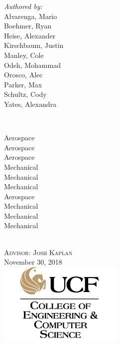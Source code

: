 \begin{titlepage}
{\begin{minipage}{0.3\textwidth}
\begin{flushleft} \large
\emph{Authored by:} \\ 
Alvarenga, Mario \\
Boehmer, Ryan \\
Heise, Alexander \\
Kirschbaum, Justin  \\
Manley, Cole \\
Odeh, Mohammad \\
Orosco, Alec \\
Parker, Max \\
Schultz, Cody \\
Yates, Alexandra \\
\end{flushleft}
\end{minipage}
~ 
\begin{minipage}{0.4\textwidth}
\begin{flushright} \large
\hfill
Aerospace \\
Aerospace \\
Aerospace \\
Mechanical \\
Mechanical \\
Mechanical \\
Aerospace \\
Mechanical \\
Mechanical \\
Mechanical \\
\end{flushright}
\end{minipage}\\[0.75cm]

\textsc{\large Advisor: Josh Kaplan}\\[0.5cm]

{\large November 30, 2018}\\[1cm] %

\includegraphics[width=0.45\textwidth]{UCF_logo.png} %
 
}
\end{titlepage}
